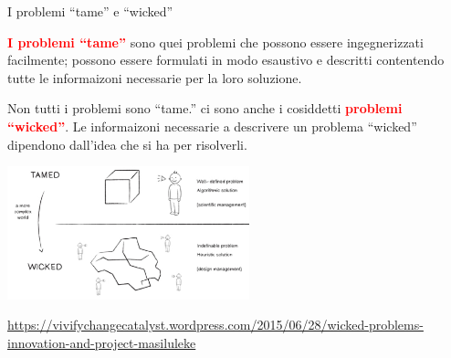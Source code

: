 \documentclass{beamer}
\begin{document}

\begin{frame}{\centerline{I problemi ``tame'' e ``wicked''}}

\begin{small}
\textcolor{red}{\bf I problemi ``tame''} sono quei problemi che possono essere ingegnerizzati facilmente; possono essere formulati in modo esaustivo e descritti contentendo tutte le informaizoni necessarie per la loro soluzione.

Non tutti i problemi sono ``tame.'' ci sono anche i cosiddetti 
\textcolor{red}{\bf problemi ``wicked''}. Le informaizoni necessarie a descrivere un problema ``wicked'' dipendono dall'idea che si ha per risolverli.

\begin{center}
\includegraphics[width=70mm]{A2022.IDSEPC.ProcessoDiProduzione/pic-03.png}
\end{center}

\end{small}

\begin{center}
\tiny
\url{https://vivifychangecatalyst.wordpress.com/2015/06/28/wicked-problems-innovation-and-project-masiluleke}

\end{center}


\end{frame}

\end{document}
